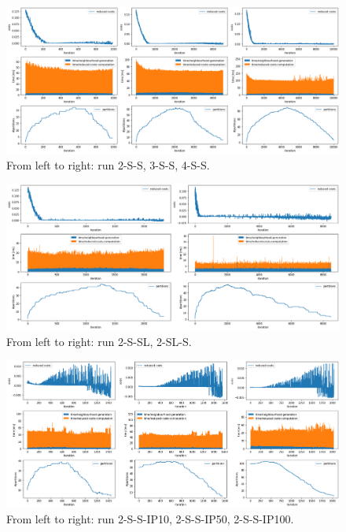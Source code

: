 \begin{landscape}
    \begin{figure}
        \includegraphics[width=22cm]{pics/experiments_2.png}
        \caption{From left to right: run 2-S-S, 3-S-S, 4-S-S.}
        \label{fig:setting2}
    \end{figure}
\end{landscape}

\begin{landscape}
    \begin{figure}
        \includegraphics[width=22cm]{pics/experiments_3.png}
        \caption{From left to right: run 2-S-SL, 2-SL-S.}
        \label{fig:setting3}
    \end{figure}
\end{landscape}

\begin{landscape}
    \begin{figure}
        \includegraphics[width=22cm]{pics/experiments_4.png}
        \caption{From left to right: run 2-S-S-IP10, 2-S-S-IP50, 2-S-S-IP100.}
        \label{fig:setting4}
    \end{figure}
\end{landscape}

